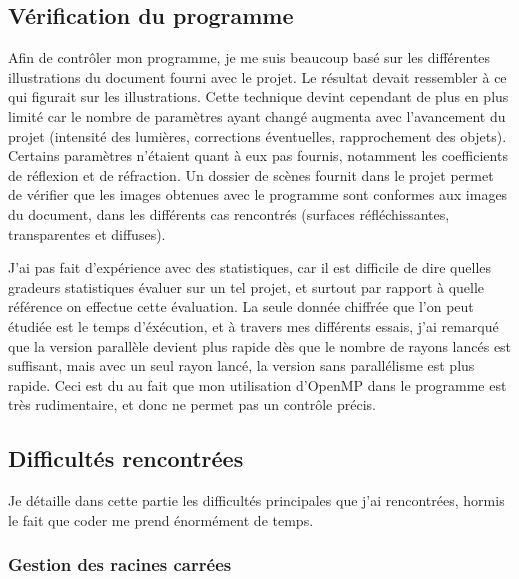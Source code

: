 \documentclass[a4paper,10pt]{article}
\begin{document}
\subsection{Vérification du programme}

Afin de contrôler mon programme, je me suis beaucoup basé sur les différentes illustrations du document fourni avec le projet. Le résultat devait ressembler à ce qui figurait sur les illustrations. Cette technique devint cependant de plus en plus limité car le nombre de paramètres ayant changé augmenta avec l'avancement du projet (intensité des lumières, corrections éventuelles, rapprochement des objets). Certains paramètres n'étaient quant à eux pas fournis, notamment les coefficients de réflexion et de réfraction. Un dossier de scènes fournit dans le projet permet de vérifier que les images obtenues avec le programme sont conformes aux images du document, dans les différents cas rencontrés (surfaces réfléchissantes, transparentes et diffuses).

J'ai pas fait d'expérience avec des statistiques, car il est difficile de dire quelles gradeurs statistiques évaluer sur un tel projet, et surtout par rapport à quelle référence on effectue cette évaluation. La seule donnée chiffrée que l'on peut étudiée est le temps d'éxécution, et à travers mes différents essais, j'ai remarqué que la version parallèle devient plus rapide dès que le nombre de rayons lancés est suffisant, mais avec un seul rayon lancé, la version sans parallélisme est plus rapide. Ceci est du au fait que mon utilisation d'OpenMP dans le programme est très rudimentaire, et donc ne permet pas un contrôle précis.

\subsection{Difficultés rencontrées}

Je détaille dans cette partie les difficultés principales que j'ai rencontrées, hormis le fait que coder me prend énormément de temps.

\subsubsection{Gestion des racines carrées}
\end{document}
